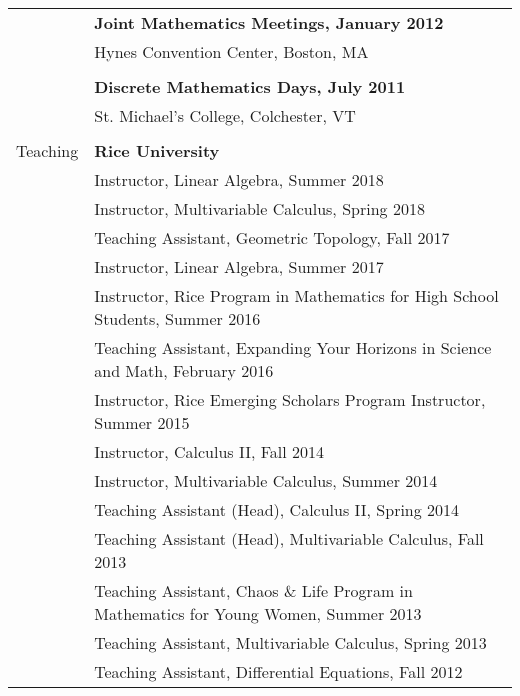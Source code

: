 \documentclass[letterpaper,11pt,oneside]{article}
\begin{document}
\begin{tabular}{@{} l l}
&\textbf{Joint Mathematics Meetings, January 2012} \\
     &  Hynes Convention Center, Boston, MA \\
     & \\
     
     &\textbf{Discrete Mathematics Days, July 2011} \\
     &   St. Michael's College, Colchester, VT \\
     & \\
     
 
  \Large{Teaching}   & \textbf{Rice University} \\
     & Instructor, Linear Algebra, Summer 2018 \\
     & Instructor, Multivariable Calculus, Spring 2018 \\   
     & Teaching Assistant, Geometric Topology, Fall 2017 \\
     & Instructor, Linear Algebra, Summer 2017 \\
     & Instructor, Rice Program in Mathematics
for High School Students, Summer 2016 \\
  & Teaching Assistant,  Expanding Your Horizons in Science and Math, February 2016 \\
    & Instructor,  Rice Emerging Scholars Program Instructor, Summer 2015 \\
     & Instructor, Calculus II, Fall 2014 \\
     & Instructor, Multivariable Calculus, Summer 2014 \\   
        & Teaching Assistant (Head), Calculus II, Spring 2014 \\  
       & Teaching Assistant (Head), Multivariable Calculus, Fall 2013 \\
   & Teaching Assistant, Chaos \& Life Program in Mathematics for Young Women, Summer 2013 \\  
          & Teaching Assistant, Multivariable Calculus, Spring 2013 \\
       & Teaching Assistant, Differential Equations, Fall 2012 \\
   \end{tabular}
     
\end{document}
